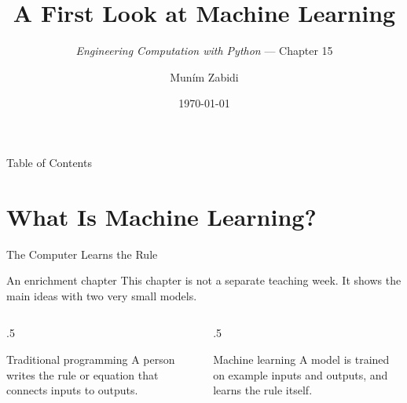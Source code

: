 \documentclass[9pt,aspectratio=169,xcolor=table]{beamer}
\title{A First Look at Machine Learning}
\subtitle{\emph{Engineering Computation with Python} --- Chapter 15}
\author{Mun\'{i}m Zabidi}
\institute{\color{primary}Faculty of Electrical Engineering, Universiti Teknologi Malaysia}
\date{\today}
\begin{document}
\titlepage

\begin{frame}{Table of Contents}
    \tableofcontents
\end{frame}

\section{What Is Machine Learning?}

\begin{frame}{The Computer Learns the Rule}
    \leavevmode
    \begin{alertblock}{An enrichment chapter}
        This chapter is \alert{not a separate teaching week}. It shows
        the main ideas with two very small models.
    \end{alertblock}

    \vspace{3mm}
    \begin{columns}[t]
        \begin{column}{.5\textwidth}
            \begin{block}{Traditional programming}
                \small A person writes the rule or equation that
                connects inputs to outputs.
            \end{block}
        \end{column}
        \begin{column}{.5\textwidth}
            \begin{block}{Machine learning}
                \small A model is trained on example inputs and outputs,
                and \alert{learns the rule itself}.
            \end{block}
        \end{column}
    \end{columns}
\end{frame}
\end{document}
